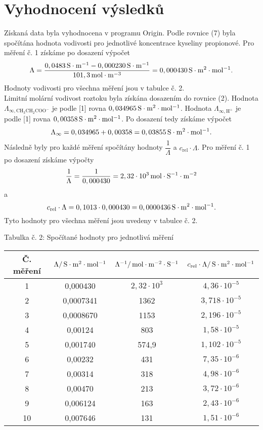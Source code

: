 \documentclass[12pt,a4paper]{article}
\def\ri#1{\mathrm{#1}}
\def\jd#1{\ifmmode\,\mathrm{#1}\else\,\textrm{#1}\fi}
\begin{document}
\section*{Vyhodnocení výsledků}
Získaná data byla vyhodnocena v programu Origin. Podle rovnice (7) byla spočítána hodnota vodivosti pro jednotlivé koncentrace kyseliny propionové. Pro měření č. 1 získáme po dosazení výpočet
$$\Lambda = \dfrac{0,0483\jd{S\cdot m^{-1}}-0,000230\jd{S\cdot m^{-1}}}{101,3\jd{mol\cdot m^{-3}}} = 0,000430\jd{S\cdot m^2\cdot mol^{-1}}.$$
Hodnoty vodivosti pro všechna měření jsou v tabulce č. 2.\\
Limitní molární vodivost roztoku byla získána dosazením do rovnice (2). Hodnota $\Lambda_\ri{\infty, CH_3CH_2COO^-}$ je podle [1] rovna $0,034965\jd{S\cdot m^2\cdot mol^{-1}}$. Hodnota $\Lambda_\ri{\infty, H^+}$ je podle [1] rovna $0,00358\jd{S\cdot m^2\cdot mol^{-1}}$. Po dosazení tedy získáme výpočet
$$\Lambda_\infty = 0,034965 + 0,00358 = 0,03855\jd{S\cdot m^2\cdot mol^{-1}}.$$
Následně byly pro každé měření spočítány hodnoty $\dfrac{1}{\Lambda}$ a $c_\ri{rel}\cdot \Lambda$. Pro měření č. 1 po dosazení získáme výpočty
$$\dfrac{1}{\Lambda} = \dfrac{1}{0,000430} = 2,32\cdot 10^3\jd{mol\cdot S^{-1}\cdot m^{-2}}$$
a $$c_\ri{rel}\cdot \Lambda = 0,1013\cdot 0,000430 = 0,0000436\jd{S\cdot m^2\cdot mol^{-1}}.$$
Tyto hodnoty pro všechna měření jsou uvedeny v tabulce č. 2.\\
\begin{center}
	\noindent Tabulka č. 2: Spočítané hodnoty pro jednotlivá měření\\
	\begin{tabular}{c|c|c|c}
		Č. měření & $\Lambda/\jd{S\cdot m^2 \cdot mol^{-1}}$ & $\Lambda^{-1}/\jd{mol\cdot m^{-2} \cdot S^{-1}}$ & $c_\ri{rel}\cdot \Lambda/\jd{S\cdot m^2 \cdot mol^{-1}}$\\
		\hline
		1 & 0,000430 & $2,32\cdot 10^3$ & $4,36\cdot 10^{-5}$\\
		2 & 0,0007341 & 1362 & $3,718\cdot 10^{-5}$\\
		3 & 0,0008670 & 1153 & $2,196\cdot 10^{-5}$\\
		4 & 0,00124 & 803 & $1,58\cdot 10^{-5}$\\
		5 & 0,001740 & 574,9 & $1,102\cdot 10^{-5}$\\
		6 & 0,00232 & 431 & $7,35\cdot 10^{-6}$\\
		7 & 0,00314 & 318 & $4,98\cdot 10^{-6}$\\
		8 & 0,00470 & 213 & $3,72\cdot 10^{-6}$\\
		9 & 0,006124 & 163 & $2,43\cdot 10^{-6}$\\
		10 & 0,007646 & 131 & $1,51\cdot 10^{-6}$\\
	\end{tabular}
\end{center}
\end{document}
